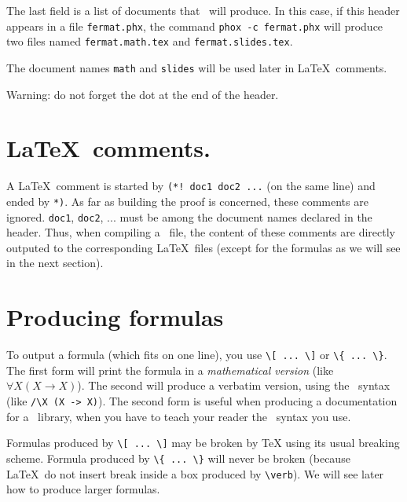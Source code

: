 The last field is a list of documents that \AFD\ will produce. In this case, if
this header appears in a file \verb#fermat.phx#, the command 
\verb#phox -c fermat.phx# will produce two files named \verb#fermat.math.tex# 
and \verb#fermat.slides.tex#.

The document names \verb#math# and \verb#slides# will be used later in
\LaTeX\ comments.

Warning: do not forget the dot at the end of the header.

\section{\LaTeX\ comments.}

A \LaTeX\ comment is started by \verb#(*! doc1 doc2 ...# (on the same line)
and ended by \verb#*)#. As far as building the proof is concerned, these
comments are ignored. \verb#doc1#, \verb#doc2#, ... must be among the document
names declared in the header. Thus, when compiling a \AFD\ file, the content
of these comments are directly outputed to the corresponding \LaTeX\ files
(except for the formulas as we will see in the next section).

\section{Producing formulas}

To output a formula (which fits on one line), you use \verb#\[ ... \]# 
or \verb#\{ ... \}#. The first form will print the formula in a
{\em mathematical version} (like $\forall X (X \to X)$). The second
will produce a verbatim version, using the \AFD\ syntax (like 
\verb#/\X (X -> X)#). 
The second form is useful when producing a documentation for a \AFD\
library, when you have to teach your reader the \AFD\ syntax you use.

Formulas produced by \verb#\[ ... \]# may be broken by TeX using its usual
breaking scheme. Formula produced by \verb#\{ ... \}# will never be broken
(because \LaTeX\ do not insert break inside a box produced by \verb#\verb#).
We will see later how to produce larger formulas.

